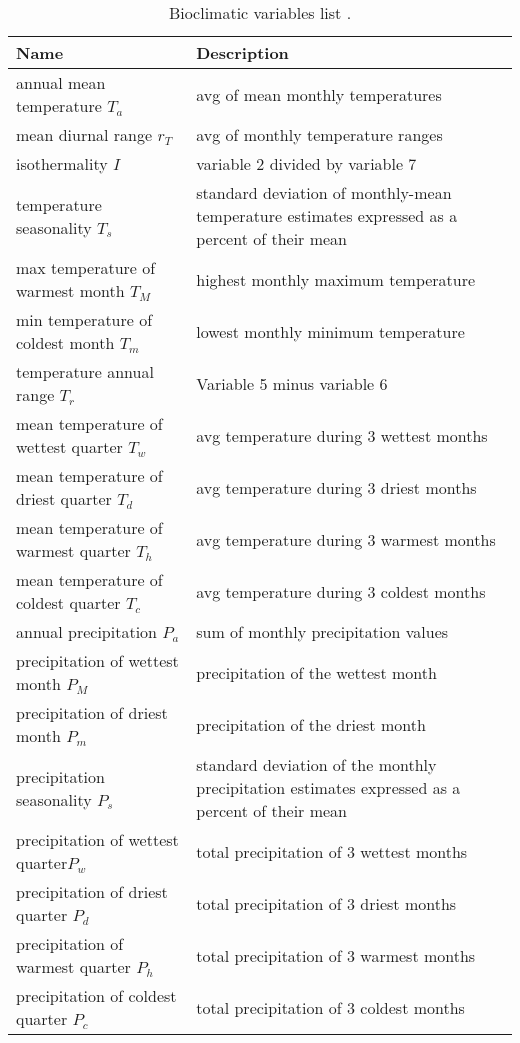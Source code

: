 \documentclass[letterpaper, 12pt]{article}
\theoremstyle{theo}
\begin{document}
\begin{refsection}
\begin{onehalfspace}
\begin{table}[h!]
\centering
\caption[Bioclimatic variables list]{Bioclimatic variables list \citep{McKenney2011}. \label{tab::bioclim}}
\begin{tabular}{p{6.75cm}p{9cm}}
	\toprule
	\textbf{Name} & \textbf{Description} \\
	\midrule
	annual mean temperature $ T_a $ & avg of mean monthly temperatures \\
	mean diurnal range $ r_T $ & avg of monthly temperature ranges \\
	isothermality $ I $ & variable 2 divided by variable 7 \\
	temperature seasonality $ T_s $ & standard deviation of monthly-mean temperature estimates expressed as a percent of their mean \\
	max temperature of warmest month $ T_M $ & highest monthly maximum temperature \\
	min temperature of coldest month $ T_m $ & lowest monthly minimum temperature \\
	temperature annual range $ T_r $ & Variable 5 minus variable 6 \\
	mean temperature of wettest quarter $ T_w $ & avg temperature during 3 wettest months \\
	mean temperature of driest quarter $ T_d $ & avg temperature during 3 driest months \\
	mean temperature of warmest quarter $ T_h $ & avg temperature during 3 warmest months \\
	mean temperature of coldest quarter $ T_c $ & avg temperature during 3 coldest months \\
	annual precipitation $ P_a $ & sum of monthly precipitation values \\
	precipitation of wettest month $ P_M $ & precipitation of the wettest month \\
	precipitation of driest month $ P_m $ & precipitation of the driest month \\
	precipitation seasonality $ P_s $ & standard deviation of the monthly precipitation estimates expressed as a percent of their mean \\
	precipitation of wettest quarter$ P_w $  & total precipitation of 3 wettest months \\
	precipitation of driest quarter $ P_d $ & total precipitation of 3 driest months \\
	precipitation of warmest quarter $ P_h $ & total precipitation of 3 warmest months \\
	precipitation of coldest quarter $ P_c $ & total precipitation of 3 coldest months \\
	\bottomrule
\end{tabular}
\end{table}


\end{onehalfspace}
\end{refsection}
\end{document}
